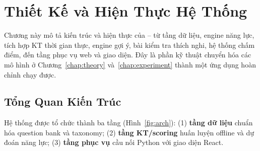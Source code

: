 \chapter{Thiết Kế và Hiện Thực Hệ Thống}
\label{chap:system}

Chương này mô tả kiến trúc và hiện thực của \system{} -- từ tầng dữ liệu, engine năng lực, tích hợp KT thời gian thực, engine gợi ý, bài kiểm tra thích nghi, hệ thống chấm điểm, đến tầng phục vụ web và giao diện. Đây là phần kỹ thuật chuyển hóa các mô hình ở Chương~\ref{chap:theory} và~\ref{chap:experiment} thành một ứng dụng hoàn chỉnh chạy được.

\section{Tổng Quan Kiến Trúc}
\label{sec:arch}

Hệ thống được tổ chức thành ba tầng (Hình~\ref{fig:arch}): (1) \textbf{tầng dữ liệu} chuẩn hóa question bank và taxonomy; (2) \textbf{tầng KT/scoring} huấn luyện offline và dự đoán năng lực; (3) \textbf{tầng phục vụ} cầu nối Python với giao diện React.

